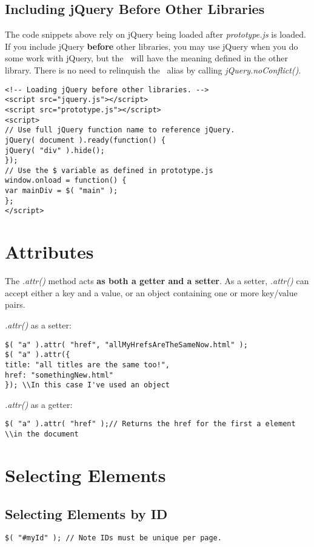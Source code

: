 \documentclass[10pt,letterpaper]{book}
\begin{document}
\subsection{Including jQuery Before Other Libraries}
The code snippets above rely on jQuery being loaded after \textit{prototype.js} is loaded. If you include jQuery \textbf{before} other libraries, you may use jQuery when you do some work with jQuery, but the \textdollar \, will have the meaning defined in the other library. There is no need to relinquish the \textdollar \, alias by calling \textit{jQuery.noConflict()}.
\begin{lstlisting}
<!-- Loading jQuery before other libraries. -->
<script src="jquery.js"></script>
<script src="prototype.js"></script>
<script>
// Use full jQuery function name to reference jQuery.
jQuery( document ).ready(function() {
jQuery( "div" ).hide();
});
// Use the $ variable as defined in prototype.js
window.onload = function() {
var mainDiv = $( "main" );
};
</script>
\end{lstlisting}
\section{Attributes}
The \textit{.attr()} method acts \textbf{as both a getter and a setter}. As a setter, \textit{.attr()} can accept either a key and a value, or an object containing one or more key/value pairs.

\textit{.attr()} as a setter:
\begin{lstlisting}
$( "a" ).attr( "href", "allMyHrefsAreTheSameNow.html" );
$( "a" ).attr({
title: "all titles are the same too!",
href: "somethingNew.html"
}); \\In this case I've used an object
\end{lstlisting}
\textit{.attr()} as a getter:
\begin{lstlisting}
$( "a" ).attr( "href" );// Returns the href for the first a element
\\in the document
\end{lstlisting}
\section{Selecting Elements}
\subsection{Selecting Elements by ID}
\begin{lstlisting}
$( "#myId" ); // Note IDs must be unique per page.
\end{lstlisting}
\end{document}
